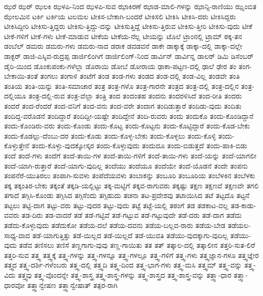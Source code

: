 {ಝರೆ
ಝರ್
ಝಲಕಿ
ಝಳಪಿ-ನಿಂದ
ಝಳಪಿ-ಸುವ
ಝಾಕಿರಣೆ
ಝಾಡ-ಮಾಲಿ-ಗಳನ್ನು
ಝಾನ್ಸಿ-ರಾಣಿಯು
ಝೃಂಬಿತ
ಝೇಲಮಿನ
ಟರ್ಕಿ
ಟರ್ಕಿಯ
ಟಲಮಲ
ಟೀಕಿಸ-ಬೇಕಾಗಿ-ಬಂದರೆ
ಟೀಕಿಸಲಿ
ಟೀಕಿಸಿ
ಟೀಕಿಸಿ-ದರು
ಟೀಕಿಸಿದ್ದರು
ಟೀಕಿಸಿದ್ದೀರಿ
ಟೀಕಿಸು-ತ್ತಿದ್ದರು
ಟೀಕಿಸು-ತ್ತಿದ್ದು-ದನ್ನು
ಟೀಕಿಸುತ್ತಿದ್ದೆ
ಟೀಕಿಸು-ತ್ತಿರುವ
ಟೀಕಿಸು-ತ್ತೀರಿ
ಟೀಕಿಸು-ವುದು
ಟೀಕೆ
ಟೀಕೆ-ಗಳಿಗೆ
ಟೀಕೆ-ಗಳು
ಟೀಕೆ-ಮಾಡುವ
ಟೀಕೆಯ
ಟೀಕೆಯ-ನೆಲ್ಲ
ಟೀಯನ್ನು
ಟೊಲೆ
ಟ್ರಾಂನಲ್ಲಿ
ಟ್ರಾಮ್
ಠಕ್ಕ-ತನ
ಡಂಬೆಲ್
ಡಮರು
ಡಮರು-ಗಳು
ಡಮರು-ನಾದ
ಡರಾಕ
ಡವಡವನೆ
ಡಾಕೇ
ಡಾಕ್ಕಾಕ್ಕೆ
ಡಾಕ್ಕಾ-ದಲ್ಲಿ
ಡಾಕ್ಕಾ-ದಲ್ಲೇ
ಡಾಕ್ಟರ್
ಡಾಜಿ-ಎಸ್ಶಿವ-ರುದ್ರಪ್ಪ
ಡಾರ್ಜಿಲಿಂಗಿಗೆ
ಡಾರ್ಜಿಲಿಂಗ್-ನಿಂದ
ಡಾರ್ವಿನ್
ಡಾರ್ವಿನ್ನ
ಡಾಲರ್
ಡಿಮಿ
ಡಿಸೆಂಬರ್
ಡೈರಿ-ಯಿಂದ
ಡೊಂಕುಪಂಕು-ಗಳೆಲ್ಲಾ
ಡೊರಾಯಿ
ಡೋಬೆ
ಡೋರಾಯ
ಢಾಕಾ-ಪಟ್ಟಣ-ದಲ್ಲಿ
ಢಾಲೆ
ಢೇರ
ತಂ
ತಂಗ-ಬೇಕಾಯಿ-ತಂತೆ
ತಂಗಲು
ತಂಗಾಳಿ
ತಂಟೆಗೆ
ತಂಡ
ತಂಡ-ಗಳು
ತಂಡದ
ತಂಡ-ದಲ್ಲಿ
ತಂಡ-ವಿಲ್ಲ
ತಂಡವೇ
ತಂತಿ
ತಂತಿಯ
ತಂತಿ-ಯನ್ನು
ತಂತಿ-ಸಮಾಚಾರ
ತಂತ್ರ
ತಂತ್ರ-ಗಳೊ
ತಂತ್ರ-ಗಾರನೇ
ತಂತ್ರದ
ತಂತ್ರ-ದಲ್ಲಿ
ತಂತ್ರ-ದಲ್ಲಿನ
ತಂತ್ರ-ದಲ್ಲಿಯೂ
ತಂತ್ರ-ದಲ್ಲಿ-ರುವ
ತಂತ್ರ-ವೆಲ್ಲಾ
ತಂತ್ರಿ
ತಂದ
ತಂದಂತಹ
ತಂದನು
ತಂದರಳಿಸಿದೆ
ತಂದ-ರೀತಿ
ತಂದರು
ತಂದರೆ
ತಂದ-ರೆಂದರೆ
ತಂದ-ವನಿಗೆ
ತಂದ-ವನು
ತಂದ-ವರೇ
ತಂದಾಗ
ತಂದಿಡುತ್ತಾರೆ
ತಂದಿಡು-ವುದು
ತಂದಿತು
ತಂದಿದ್ದ-ವರೊಡನೆ
ತಂದಿದ್ದಾರೆ
ತಂದಿದ್ದೀ-ಯಷ್ಟೇ
ತಂದಿದ್ದೇನೆ
ತಂದಿ-ರುವರು
ತಂದು
ತಂದುಕೊ
ತಂದು-ಕೊಂಡಿದ್ದಾನೆ
ತಂದು-ಕೊಂಡಿರು-ವರು
ತಂದು-ಕೊಂಡು
ತಂದು-ಕೊಟ್ಟ
ತಂದು-ಕೊಟ್ಟನು
ತಂದು-ಕೊಟ್ಟಿದ್ದಾರೆ
ತಂದು-ಕೊಡ-ಬೇಕು
ತಂದು-ಕೊಡಲ್ಲು-ದೆಂಬು-ದರ
ತಂದು-ಕೊಡು
ತಂದು-ಕೊಳ್ಳ-ಬೇಕು
ತಂದು-ಕೊಳ್ಳಲು
ತಂದು-ಕೊಳ್ಳಿ
ತಂದು-ಕೊಳ್ಳುತ್ತೇನೆ
ತಂದು-ಕೊಳ್ಳು-ವುದಕ್ಕೋಸ್ಕರ
ತಂದು-ಕೊಳ್ಳುವುದು
ತಂದುದೂ
ತಂದು-ಬಿಡುತ್ತದೆ
ತಂದು-ಹಾಕಿ-ಬಿಡು
ತಂದೆ
ತಂದೆ-ಗಳು
ತಂದೆಗೆ
ತಂದೆ-ತಾಯಿ-ಗಳ
ತಂದೆ-ತಾಯಿ-ಗಳಿಗೆ
ತಂದೆ-ತಾಯಿ-ಗಳು
ತಂದೆ-ಯನ್ನು
ತಂದೆ-ಯಾಗಲೀ
ತಂದೆ-ಯಾಗಿ-ರುತ್ತಾರೆ
ತಂದೆ-ಯಾಗು-ವುದಿಲ್ಲ
ತಂದೆಯು
ತಂದೆಯೂ
ತಂದೆಯೇ
ತಂದೆ-ಯೊಡನೆ
ತಂದೇ
ತಂಪನು
ತಂಪನೆರೆ-ಯುತಿರಲು
ತಂಪಾಗಿ-ಸುವಳು
ತಂಪೆದೆಯವಳು
ತಂಬಾಕನ್ನು
ತಂಬೂರಿ
ತಂಬೂರಿಯ
ತಂಬೆಳಕಿನ
ತಂಬೆಳಕು
ತಕ್ಕ
ತಕ್ಕಂತಿರ-ಬೇಕು
ತಕ್ಕಂತೆ
ತಕ್ಕಡಿ-ಯಲ್ಲಿಟ್ಟು
ತಕ್ಕ-ಮಟ್ಟಿಗೆ
ತಕ್ಕವ-ರಾಗುವರು
ತಕ್ಕಷ್ಟು
ತಕ್ಷಣ
ತಕ್ಷಣವೆ
ತಕ್ಷಣವೇ
ತಗಲಿ
ತಗಾದೆ
ತಗ್ಗಿಸಿ-ಕೊಂಡು
ತಗ್ಗಿಸಿದ
ತಗ್ಗಿಸೆಂದು
ತಗ್ಗಿಹುದು
ತಚನಾ
ತಟ-ಪ್ರದೇಶವು
ತಟಾಯಿಸಿದ
ತಟೆ
ತಟ್ಟದೊ
ತಟ್ಟನೆ
ತಟ್ಟಲು
ತಟ್ಟಿ-ದಾಗ
ತಟ್ಟು-ವರು
ತಟ್ಟು-ವುದರ
ತಟ್ಟು-ವುದು
ತಟ್ಟೆ
ತಟ್ಟೆ-ಯಲ್ಲಿ
ತಠಂಗೆ
ತಡ
ತಡಕಾಟ-ವಲ್ಲ
ತಡ-ಕಾಡು-ವವರು
ತಡ-ದಿರು
ತಡ-ವಾದರೆ
ತಡೆ
ತಡೆ-ಗಟ್ಟಿವೆ
ತಡೆ-ಗಟ್ಟುವ
ತಡೆ-ಗಟ್ಟುವುದೇ
ತಡೆ-ದರು
ತಡೆ-ದಾಗ
ತಡೆದು
ತಡೆದು-ಕೊಳ್ಳುವುದು
ತಡೆದುಕೋ
ತಡೆಯ-ದಲೆ
ತಡೆಯ-ದವನು
ತಡೆಯ-ಬಲ್ಲವ-ರಾರು
ತಡೆಯ-ಬೇಡ
ತಡೆಯಲ-ಸಾಧ್ಯ-ವಾದ
ತಡೆ-ಯಾಗುತ್ತಿತ್ತು
ತಡೆ-ಯಿಲ್ಲದ
ತಡೆ-ಯಿಲ್ಲದೆ
ತಡೆ-ಯುವತಿ
ತಡೆಯು-ವುದಕ್ಕಾಗು-ವುದಿಲ್ಲ
ತಡೆಯು-ವುದು
ತಡೆವ
ತಣಿಸಲು
ತಣಿಸೆ
ತಣ್ಣಗಾಗು-ವುವು
ತಣ್ಣ-ಗಾಯಿತು
ತತ
ತತ್
ತತ್ಕಾಲ-ದಲ್ಲಿ
ತತ್ಕಾಲೀನ
ತತ್ತರಿ-ಸುತ-ಲಿರೆ
ತತ್ತರಿ-ಸುವ
ತತ್ತ್ವ
ತತ್ತ್ವಕ್ಕೆ
ತತ್ತ್ವ-ಗಳನ್ನು
ತತ್ತ್ವ-ಗಳನ್ನೂ
ತತ್ತ್ವ-ಗಳಲ್ಲೂ
ತತ್ತ್ವ-ಗಳಿಗೆ
ತತ್ತ್ವ-ಗಳು
ತತ್ತ್ವಜ್ಞಾನ-ಗಳೂ
ತತ್ತ್ವಜ್ಞೇರ
ತತ್ತ್ವದ
ತತ್ತ್ವ-ದರ್ಶಿ-ಗಳೆಂಬರು
ತತ್ತ್ವ-ದಲ್ಲಿ
ತತ್ತ್ವದಿ
ತತ್ತ್ವ-ದಿಂದ
ತತ್ತ್ವ-ಭಾಗ-ಗಳು
ತತ್ತ್ವ-ಮಸಿ
ತತ್ತ್ವಮ್
ತತ್ತ್ವ-ವನ್ನು
ತತ್ತ್ವ-ವಿದು
ತತ್ತ್ವವು
ತತ್ತ್ವ-ವೊಂದನ್ನೇ
ತತ್ತ್ವ-ಶಾಸ್ತ್ರ
ತತ್ತ್ವ-ಶಾಸ್ತ್ರ-ಗಳನ್ನು
ತತ್ತ್ವ-ಶಾಸ್ತ್ರದ
ತತ್ತ್ವ-ಶಾಸ್ತ್ರ-ವನ್ನು
ತತ್ತ್ವಾ-ಧಾರ
ತತ್ತ್ವಾ-ಧಾರವೋ
ತತ್ತ್ವಾನ್ವೇಷಣ
ತತ್ತ್ವಾನ್ವೇಷಾತ್
ತತ್ಪರ-ರಾಗಿ
}
